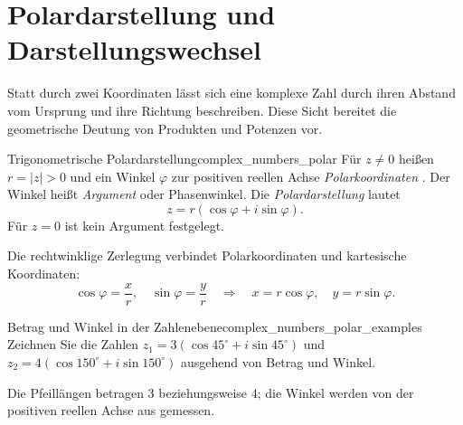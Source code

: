 \section{Polardarstellung und Darstellungswechsel}
\label{sec:complex_numbers_polar_form}
Statt durch zwei Koordinaten lässt sich eine komplexe Zahl durch ihren
Abstand vom Ursprung und ihre Richtung beschreiben. Diese Sicht bereitet
die geometrische Deutung von Produkten und Potenzen vor.

\begin{DefinitionBox}{Trigonometrische Polardarstellung}{complex_numbers_polar}
  Für $z\ne0$ heißen $r=|z|>0$ und ein Winkel $\varphi$ zur positiven
  reellen Achse \emph{Polarkoordinaten} .
  Der Winkel heißt \emph{Argument}  oder Phasenwinkel.
  Die \emph{Polardarstellung}  lautet
  \[
    z=r(\cos\varphi+i\sin\varphi).
  \]
  Für $z=0$ ist kein Argument festgelegt.
  \begin{center}
  \end{center}
\end{DefinitionBox}
Die rechtwinklige Zerlegung verbindet Polarkoordinaten und kartesische Koordinaten:
\[
  \cos\varphi=\frac{x}{r},\quad \sin\varphi=\frac{y}{r}
  \quad\Longrightarrow\quad
  x=r\cos\varphi,\quad y=r\sin\varphi.
\]
\begin{ExampleBox}{Betrag und Winkel in der Zahlenebene}{complex_numbers_polar_examples}
  Zeichnen Sie die Zahlen $z_1=3(\cos45^\circ+i\sin45^\circ)$ und
  $z_2=4(\cos150^\circ+i\sin150^\circ)$ ausgehend von Betrag und Winkel.
  \begin{center}
  \end{center}
  Die Pfeillängen betragen $3$ beziehungsweise $4$; die Winkel werden
  von der positiven reellen Achse aus gemessen.
\end{ExampleBox}

\clearpage
